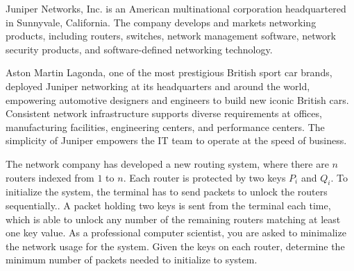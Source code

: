 Juniper Networks, Inc. is an American multinational corporation headquartered in Sunnyvale, California.
The company develops and markets networking products,
including routers, switches, network management software, network security products,
and software-defined networking technology.

Aston Martin Lagonda, one of the most prestigious British sport car brands,
deployed Juniper networking at its headquarters and around the world,
empowering automotive designers and engineers to build new iconic British cars.
Consistent network infrastructure supports diverse requirements at offices,
manufacturing facilities, engineering centers, and performance centers.
The simplicity of Juniper empowers the IT team to operate at the speed of business.

The network company has developed a new routing system,
where there are $n$ routers indexed from $1$ to $n$.
Each router is protected by two keys $P_i$ and $Q_i$.
To initialize the system, the terminal has to send packets to unlock the routers sequentially..
A packet holding two keys is sent from the terminal each time,
which is able to unlock any number of the remaining routers matching at least one key value.
As a professional computer scientist, you are asked to minimalize the network usage for the system.
Given the keys on each router, determine the minimum number of packets needed to initialize to system.
